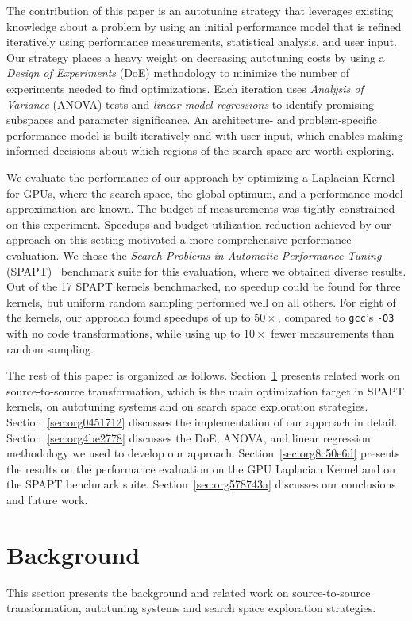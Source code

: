 \documentclass[conference]{IEEEtran}
\begin{document}
The contribution of this paper is an autotuning strategy that leverages existing
knowledge about a problem by using an initial performance model that is refined
iteratively using performance measurements, statistical analysis, and user
input. Our strategy places a heavy weight on decreasing autotuning costs by
using a \emph{Design of Experiments} (DoE) methodology to minimize the number of
experiments needed to find optimizations. Each iteration uses \emph{Analysis of
Variance} (ANOVA) tests and \emph{linear model regressions} to identify promising
subspaces and parameter significance. An architecture- and problem-specific
performance model is built iteratively and with user input, which enables making
informed decisions about which regions of the search space are worth exploring.

We evaluate the performance of our approach by optimizing a Laplacian Kernel for
GPUs, where the search space, the global optimum, and a performance model
approximation are known. The budget of measurements was tightly constrained on
this experiment. Speedups and budget utilization reduction achieved by our
approach on this setting motivated a more comprehensive performance evaluation.
We chose the \emph{Search Problems in Automatic Performance Tuning}
(SPAPT)~\cite{balaprakash2012spapt} benchmark suite for this evaluation,
where we obtained diverse results. Out of the 17 SPAPT kernels benchmarked, no
speedup could be found for three kernels, but uniform random sampling performed
well on all others. For eight of the kernels, our approach found speedups of up
to \(50\times\), compared to \texttt{gcc}'s \texttt{-O3} with no code transformations, while
using up to \(10\times\) fewer measurements than random sampling.

The rest of this paper is organized as follows. Section~\ref{sec:orged7e39d}
presents related work on source-to-source transformation, which is the main
optimization target in SPAPT kernels, on autotuning systems and on search space
exploration strategies. Section~\ref{sec:org0451712}
discusses the implementation of our approach in detail. Section~\ref{sec:org4be2778} discusses the DoE, ANOVA, and linear regression methodology we used
to develop our approach. Section~\ref{sec:org8c50e6d} presents the
results on the performance evaluation on the GPU Laplacian Kernel and on the
SPAPT benchmark suite. Section~\ref{sec:org578743a} discusses our conclusions and
future work.
\section{Background}
\label{sec:orged7e39d}
This section presents the background and related work on source-to-source
transformation, autotuning systems and search space exploration strategies.
\end{document}
